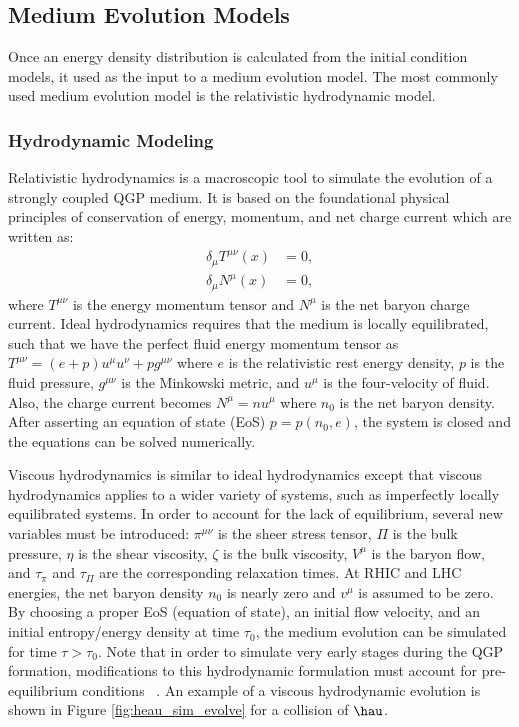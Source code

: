 \subsection{Medium Evolution Models}
Once an energy density distribution is calculated from the initial condition models, it used as the input to a medium evolution model. The most commonly used medium evolution model is the relativistic hydrodynamic model.

\subsubsection{Hydrodynamic Modeling}
Relativistic hydrodynamics is a macroscopic tool to simulate the evolution of a strongly coupled QGP medium. It is based on the foundational physical principles of conservation of energy, momentum, and net charge current which are written as:
\begin{align}
\delta_{\mu} T^{\mu\nu}(x) &= 0,\\
\delta_{\mu} N^{\mu}(x) &= 0,
\end{align}
where $T^{\mu\nu}$ is the energy momentum tensor and $N^{\mu}$ is the net baryon charge current. Ideal hydrodynamics requires that the medium is locally equilibrated, such that we have the perfect fluid energy momentum tensor as $T^{\mu\nu} = (e+p)u^\mu u^\nu+pg^{\mu\nu}$ where $e$ is the relativistic rest energy density, $p$ is the fluid pressure, $g^{\mu\nu}$ is the Minkowski metric, and $u^\mu$ is the four-velocity of fluid. Also, the charge current becomes $N^\mu = nu^\mu$ where $n_0$ is the net baryon density. After asserting an equation of state (EoS) $p = p(n_0,e)$, the system is closed and the equations can be solved numerically.

Viscous hydrodynamics is similar to ideal hydrodynamics except that viscous hydrodynamics applies to a wider variety of systems, such as imperfectly locally equilibrated systems. In order to account for the lack of equilibrium, several new variables must be introduced: $\pi^{\mu\nu}$ is the sheer stress tensor, $\Pi$ is the bulk pressure, $\eta$ is the shear viscosity, $\zeta$ is the bulk viscosity, $V^\mu$ is the baryon flow, and $\tau_\pi$ and $\tau_\Pi$ are the corresponding relaxation times. At RHIC and LHC energies, the net baryon density $n_0$ is nearly zero and $v^\mu$ is assumed to be zero. By choosing a proper EoS (equation of state), an initial flow velocity, and an initial entropy/energy density at time $\tau_0$, the medium evolution can be simulated for time $\tau > \tau_0$. Note that in order to simulate very early stages during the QGP formation, modifications to this hydrodynamic formulation must account for pre-equilibrium conditions ~\cite{Song2015}. An example of a viscous hydrodynamic evolution is shown in Figure \ref{fig:heau_sim_evolve} for a collision of $\hau$.

